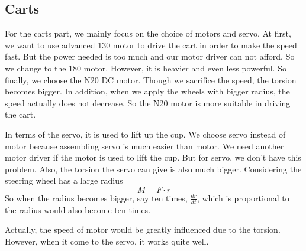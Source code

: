 \subsection{Carts}
For the carts part, we mainly focus on the choice of motors and servo. At first, we want to use advanced 130 motor to drive the cart in order to make the speed fast. But the power needed is too much and our motor driver can not afford. So we change to the 180 motor. However, it is heavier and even less powerful. So finally, we choose the N20 DC motor. Though we sacrifice the speed, the torsion becomes bigger. In addition, when we apply the wheels with bigger radius, the speed actually does not decrease. So the N20 motor is more suitable in driving the cart. 
\par
In terms of the servo, it is used to lift up the cup. We choose servo instead of motor because assembling servo is much easier than motor. We need another motor driver if the motor is used to lift the cup. But for servo, we don’t have this problem. Also, the torsion the servo can give is also much bigger. Considering the steering wheel has a large radius
$$M=F\cdot r$$
So when the radius becomes bigger, say ten times, $\frac{dr}{dt}$, which is proportional to the radius would also become ten times. 
\par
Actually, the speed of motor would be greatly influenced due to the torsion. However, when it come to the servo, it works quite well.